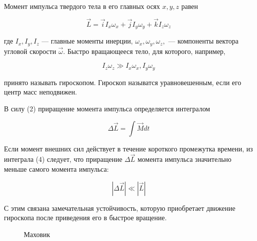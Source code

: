 \documentclass[14pt]{article}
\begin{document}
Момент импульса твердого тела в его главных осях $x, y, z$ равен

\begin{equation}
\vec{L} = \vec{i}I_x\omega_x + \vec{j}I_y\omega_y + \vec{k}I_z\omega_z
\end{equation}

\noindent где $I_x, I_y, I_z$ --- главные моменты инерции, $\omega_x, \omega_y, \omega_z,$ --- компоненты вектора угловой скорости 
$\vec{\omega}$. Быстро вращающееся тело, для которого, например,

$$I_z\omega_z \gg I_x\omega_x, I_y\omega_y$$

\noindent принято называть гироскопом. Гироскоп называтся уравновешенным, если его центр масс неподвижен.

В силу (2) приращение момента импульса определяется интегралом

\begin{equation}
\Delta \vec{L} = \int\vec{M}dt
\end{equation}

\noindent Если момент внешних сил действует в течение короткого промежутка времени, из интеграла (4) следует, что приращение $\Delta\vec{L}$ момента импульса значительно меньше самого момента импульса:

\begin{equation}
|\Delta\vec{L}| \ll |\vec{L}|
\end{equation}

\noindent С этим связана замечательная устойчивость, которую приобретает движение гироскопа после приведения его в быстрое вращение.

\begin{figure}[h!]
	\caption{Маховик}
	\label{fig:image}
\end{figure} 
\end{document}
